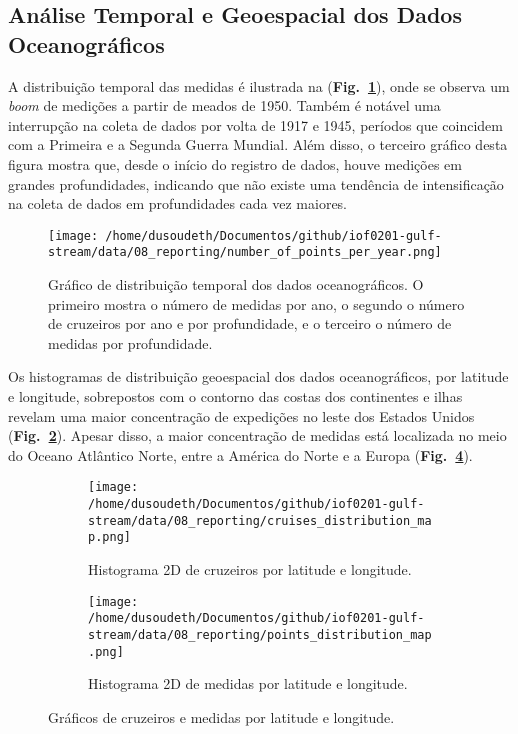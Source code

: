\documentclass[journal]{IEEEtran}
\newcommand{\figref}[1]{(\textbf{Fig.~\ref{#1}})}
\begin{document}
        \subsection{Análise Temporal e Geoespacial dos Dados Oceanográficos}
            A distribuição temporal das medidas é ilustrada na \figref{fig:img_number_of_points_per_year}, onde se observa um \emph{boom} de medições a partir de meados de 1950. Também é notável uma interrupção na coleta de dados por volta de 1917 e 1945, períodos que coincidem com a Primeira e a Segunda Guerra Mundial. Além disso, o terceiro gráfico desta figura mostra que, desde o início do registro de dados, houve medições em grandes profundidades, indicando que não existe uma tendência de intensificação na coleta de dados em profundidades cada vez maiores.
            \begin{figure}[ht]
                \centering
                \texttt{[image: /home/dusoudeth/Documentos/github/iof0201-gulf-stream/data/08\_reporting/number\_of\_points\_per\_year.png]}
                \caption{Gráfico de distribuição temporal dos dados oceanográficos. O primeiro mostra o número de medidas por ano, o segundo o número de cruzeiros por ano e por profundidade, e o terceiro o número de medidas por profundidade.}
                \label{fig:img_number_of_points_per_year}
            \end{figure}
            Os histogramas de distribuição geoespacial dos dados oceanográficos, por latitude e longitude, sobrepostos com o contorno das costas dos continentes e ilhas revelam uma maior concentração de expedições no leste dos Estados Unidos \figref{fig:img_cruises_distribution_map}. Apesar disso, a maior concentração de medidas está localizada no meio do Oceano Atlântico Norte, entre a América do Norte e a Europa \figref{fig:img_points_distribution_map}.
            \begin{figure}[ht]
                \centering
                \begin{subfigure}[b]{0.45\linewidth}
                    \texttt{[image: /home/dusoudeth/Documentos/github/iof0201-gulf-stream/data/08\_reporting/cruises\_distribution\_map.png]}
                    \caption{Histograma 2D de cruzeiros por latitude e longitude.}
                    \label{fig:img_cruises_distribution_map}
                \end{subfigure}
                \begin{subfigure}[b]{0.45\linewidth}
                    \texttt{[image: /home/dusoudeth/Documentos/github/iof0201-gulf-stream/data/08\_reporting/points\_distribution\_map.png]}
                    \caption{Histograma 2D de medidas por latitude e longitude.}
                    \label{fig:img_points_distribution_map}
                \end{subfigure}
                \caption{Gráficos de cruzeiros e medidas por latitude e longitude.}
            \end{figure}
\end{document}
